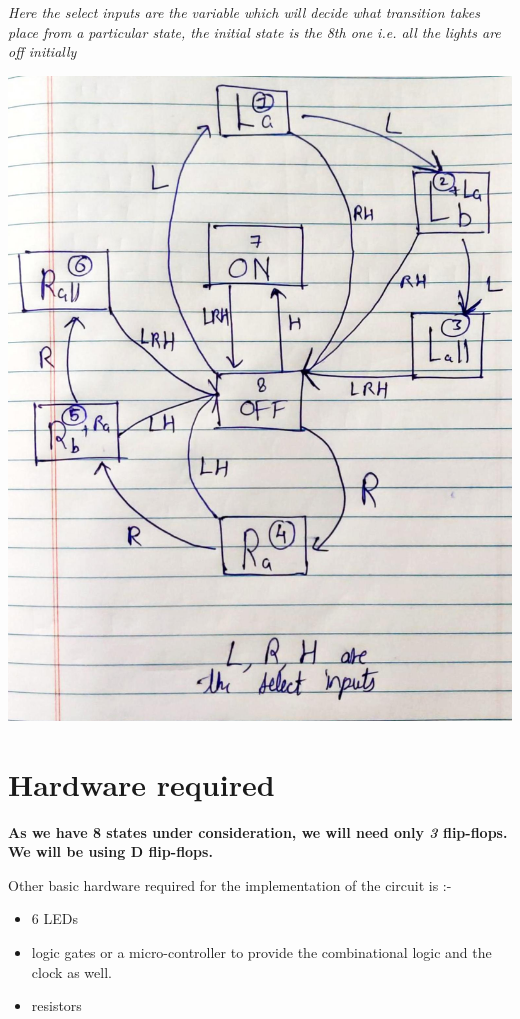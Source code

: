 \documentclass[12pt,a4paper]{report}
\begin{document}
\textit{Here the select inputs are the variable which will decide what transition takes place from a particular state, the initial state is the  8th one i.e. all the lights are off initially }
\begin{center}
\includegraphics[width=18cm]{"state transition diagram"}
\end{center}

\clearpage
\section{Hardware required}

\textbf{As we have  8 states under consideration, we will need only \textit{3} flip-flops. \\ We will be using D flip-flops. \\}

Other basic hardware required for the implementation of the circuit is :-

\begin{itemize}
    \item 6 LEDs
    \item logic gates or a micro-controller to provide the combinational logic and the clock as well.
    \item resistors
\end{itemize}
\end{document}
